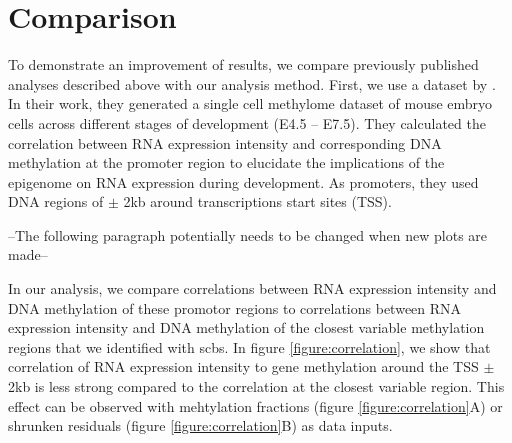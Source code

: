 \documentclass[twocolumn,10pt]{article}
\begin{document}
\setcounter{secnumdepth}{0}


\section{Comparison}

To demonstrate an improvement of results, we compare previously published analyses described above with our analysis method.
First, we use a dataset by \citealp{Argelaguet_2019}. In their work, they generated a single cell methylome dataset of mouse embryo cells across different stages of development (E4.5 – E7.5). They calculated the correlation between RNA expression intensity and corresponding DNA methylation at the promoter region to elucidate the implications of the epigenome on RNA expression during development. As promoters, they used DNA regions of $\pm$ 2kb around transcriptions start sites (TSS). 


--The following paragraph potentially needs to be changed when new plots are made--


In our analysis, we compare correlations between RNA expression intensity and DNA methylation of these promotor regions to correlations between RNA expression intensity and DNA methylation of the closest variable methylation regions that we identified with scbs. In figure \ref{figure:correlation}, we show that correlation of RNA expression intensity to gene methylation around the TSS $\pm$ 2kb is less strong compared to the correlation at the closest variable region. This effect can be observed with mehtylation fractions (figure \ref{figure:correlation}A) or shrunken residuals (figure \ref{figure:correlation}B) as data inputs.
\end{document}
